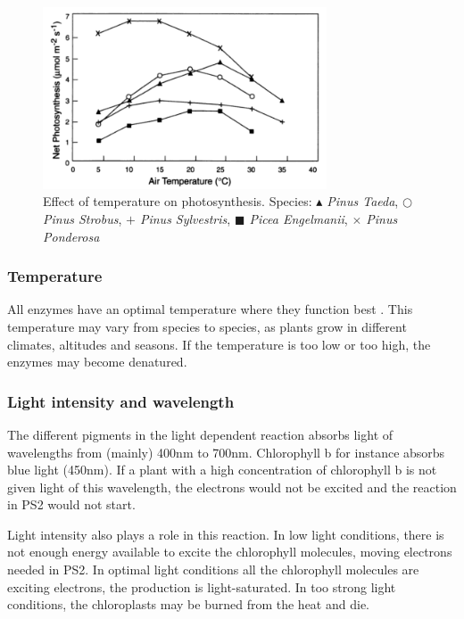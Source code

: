 \begin{figure}
\centering
\includegraphics[width=0.75\textwidth]{img/photosynthesis/temperature_new.png}
\caption{Effect of temperature on photosynthesis. Species:
 \textit{\ensuremath{\blacktriangle} Pinus Taeda},  
\textit{\ensuremath{\bigcirc} Pinus Strobus}, 
\textit{\ensuremath{+} Pinus Sylvestris}, 
\textit{\ensuremath{\blacksquare} Picea Engelmanii}, 
\textit{\ensuremath{\times} Pinus Ponderosa}
\citep{hollinger1995external}
}
\label{fig:temperature}
\end{figure}

\subsubsection{Temperature}
All enzymes have an optimal temperature where they function best \citep{bios}. This temperature may vary from species to species, as plants grow in different climates, altitudes and seasons. If the temperature is too low or too high, the enzymes may become denatured.  

\subsubsection{Light intensity and wavelength}
The different pigments in the light dependent reaction absorbs light of wavelengths from (mainly) 400nm to 700nm. Chlorophyll b for instance absorbs blue light (450nm). If a plant with a high concentration of chlorophyll b is not given light of this wavelength, the electrons would not be excited and the reaction in PS2 would not start.

Light intensity also plays a role in this reaction. In low light conditions, there is not enough energy available to excite the chlorophyll molecules, moving electrons needed in PS2. In optimal light conditions all the chlorophyll molecules are exciting electrons, the production is light-saturated. In too strong light conditions, the chloroplasts may be burned from the heat and die.  

